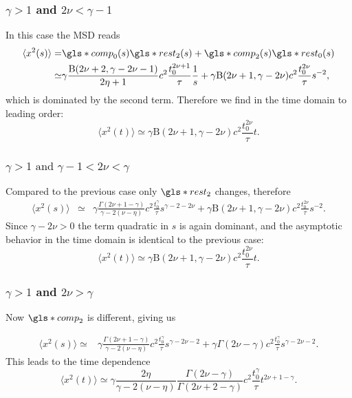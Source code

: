 \subsubsection{$\gamma>1$ and $2\nu < \gamma-1$}
In this case the MSD reads
\begin{align}
\langle x^2(s) \rangle =& \gls*{comp}_0(s) \gls*{rest}_2(s) + \gls*{comp}_2(s)  \gls*{rest}_0(s) \nonumber \\
 \simeq & \gamma \frac{\mathrm{B}(2\nu +2, \gamma - 2\nu -1)}{2\eta+1} c^2 \frac{t_0^{2\nu+1}}{\tau}\frac{1} {s}   + \gamma \mathrm{B}(2\nu+1,\gamma-2\nu) c^2 \frac{t_0^{2\nu}}{\tau}  s^{-2} \nonumber ,
\end{align}
which is dominated by the second term. Therefore we find in the time domain to leading order:
\begin{equation}
\langle x^2(t) \rangle \simeq \gamma \mathrm{B}(2\nu+1,\gamma-2\nu) c^2 \frac{ t_0^{2\nu}}{\tau}  t.
\end{equation}

\subsubsection{$\gamma>1 \text{ and }  \gamma-1 <2\nu < \gamma$}
Compared to the previous case only $\gls*{rest}_2$ changes, therefore
\begin{align}
\langle x^2(s) \rangle &\simeq & \gamma \frac{\Gamma(2\nu+1-\gamma)}{\gamma - 2(\nu-\eta)} c^2\frac{t_0^{\gamma}}{\tau}  s^{\gamma-2-2\nu}  + \gamma \mathrm{B}(2\nu+1,\gamma-2\nu) c^2\frac{t_0^{2\nu}}{\tau}  s^{-2} .
\end{align}
Since $\gamma-2\nu>0$ the term quadratic in $s$ is again dominant, and the asymptotic behavior in the time domain is identical to the previous case:
\begin{equation}
\langle x^2(t) \rangle \simeq   \gamma \mathrm{B}(2\nu+1,\gamma-2\nu) c^2
\frac{t_0^{2\nu}}{\tau}  t.
\end{equation}

\subsubsection{$\gamma>1$ and $2\nu > \gamma$}
Now $\gls*{comp}_2$ is different, giving us 

\begin{align}
\langle x^2(s) \rangle \simeq & \gamma \frac{\Gamma(2\nu+1-\gamma)}{\gamma - 2(\nu-\eta)} c^2 \frac{t_0^{\gamma}}{\tau}  s^{\gamma-2\nu-2} + \gamma \Gamma(2\nu-\gamma) c^2\frac {t_0^{\gamma}}{\tau}  s^{\gamma-2\nu-2}. 
\end{align}
This leads to the time dependence 
\begin{equation}
\langle x^2(t) \rangle \simeq \gamma   \frac{2 \eta }{\gamma - 2(\nu-\eta) } \frac{\Gamma(2\nu-\gamma)}{\Gamma(2\nu + 2-\gamma)} c^2  \frac{t_0^{\gamma}}{\tau } t^{2\nu+1-\gamma}.
\end{equation}

